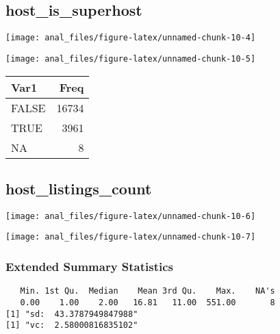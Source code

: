 \hypertarget{host_is_superhost}{%
\subsection{host\_is\_superhost}\label{host_is_superhost}}

\begin{center}\texttt{[image: anal\_files/figure-latex/unnamed-chunk-10-4]} \end{center}

\begin{center}\texttt{[image: anal\_files/figure-latex/unnamed-chunk-10-5]} \end{center}

\begin{table}[H]
\centering
\begin{tabular}[t]{lr}
\toprule
Var1 & Freq\\
\midrule
FALSE & 16734\\
TRUE & 3961\\
NA & 8\\
\bottomrule
\end{tabular}
\end{table}
\pagebreak

\hypertarget{host_listings_count}{%
\subsection{host\_listings\_count}\label{host_listings_count}}

\begin{center}\texttt{[image: anal\_files/figure-latex/unnamed-chunk-10-6]} \end{center}

\begin{center}\texttt{[image: anal\_files/figure-latex/unnamed-chunk-10-7]} \end{center}

\hypertarget{extended-summary-statistics}{%
\subsubsection{Extended Summary
Statistics}\label{extended-summary-statistics}}

\begin{verbatim}   Min. 1st Qu.  Median    Mean 3rd Qu.    Max.    NA's 
   0.00    1.00    2.00   16.81   11.00  551.00       8 
[1] "sd:  43.3787949847988"
[1] "vc:  2.58000816835102"
\end{verbatim}

